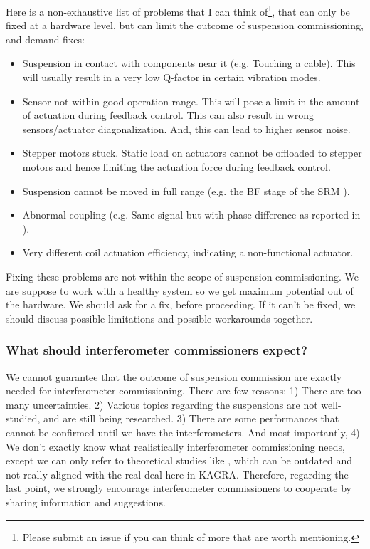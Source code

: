 Here is a non-exhaustive list of problems that I can think of\footnote{Please submit an issue if you can think of more that are worth mentioning.}, that can only be fixed at a hardware level, but can limit the outcome of suspension commissioning, and demand fixes:
\begin{itemize}
	\item Suspension in contact with components near it (e.g. Touching a cable). This will usually result in a very low Q-factor in certain vibration modes.
	\item Sensor not within good operation range. This will pose a limit in the amount of actuation during feedback control. This can also result in wrong sensors/actuator diagonalization. And, this can lead to higher sensor noise.
	\item Stepper motors stuck. Static load on actuators cannot be offloaded to stepper motors and hence limiting the actuation force during feedback control.
	\item Suspension cannot be moved in full range (e.g. the BF stage of the SRM \cite{SRM_work}).
	\item Abnormal coupling (e.g. Same signal but with phase difference as reported in \cite{prequa}).
	\item Very different coil actuation efficiency, indicating a non-functional actuator.
\end{itemize}
Fixing these problems are not within the scope of suspension commissioning.
We are suppose to work with a healthy system so we get maximum potential out of the hardware.
We should ask for a fix, before proceeding.
If it can't be fixed, we should discuss possible limitations and possible workarounds together.

\subsubsection{What should interferometer commissioners expect?}
We cannot guarantee that the outcome of suspension commission are exactly needed for interferometer commissioning.
There are few reasons:
1) There are too many uncertainties.
2) Various topics regarding the suspensions are not well-studied, and are still being researched.
3) There are some performances that cannot be confirmed until we have the interferometers.
And most importantly, 4) We don't exactly know what realistically interferometer commissioning needs, except we can only refer to theoretical studies like \cite{Sekiguchi:2016bmv}, which can be outdated and not really aligned with the real deal here in KAGRA.
Therefore, regarding the last point, we strongly encourage interferometer commissioners to cooperate by sharing information and suggestions.

